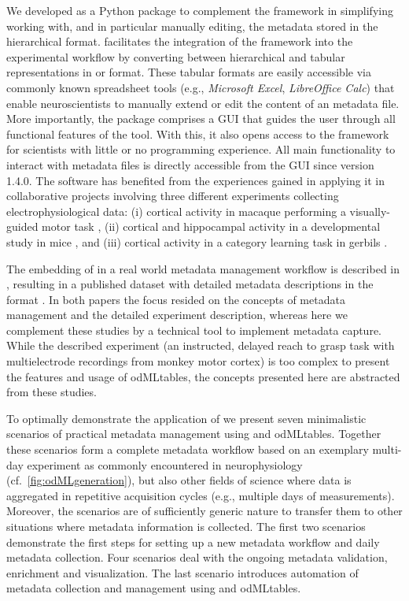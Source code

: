 We developed  as a Python package to complement the  framework in simplifying working with, and in particular manually editing, the metadata stored in the hierarchical  format.  facilitates the integration of the  framework into the experimental workflow by converting between hierarchical  and tabular representations in  or  format. These tabular formats are easily accessible via commonly known spreadsheet tools (e.g., \textit{Microsoft Excel}, \textit{LibreOffice Calc}) that enable neuroscientists to manually extend or edit the content of an  metadata file. More importantly, the  package comprises a GUI that guides the user through all functional features of the tool. With this, it also opens access to the  framework for scientists with little or no programming experience. All main functionality to interact with metadata files is directly accessible from the  GUI since version 1.4.0. The software has benefited from the experiences gained in applying it in collaborative projects involving three different experiments collecting electrophysiological data: (i) cortical activity in macaque performing a visually-guided motor task \citep[e.g.,][]{Denker_2018,Brochier_2018}, (ii) cortical and hippocampal activity in a developmental study in mice \citep[e.g.,][]{Bitzenhofer_2017}, and (iii) cortical activity in a category learning task in gerbils \citep[e.g.,][]{Ohl_2001}.

The embedding of  in a real world metadata management workflow is described in \cite{Zehl_2016}, resulting in a published dataset with detailed metadata descriptions in the  format  \citep{Brochier_2018}. In both papers the focus resided on the concepts of metadata management and the detailed experiment description, whereas here we complement these studies by a technical tool to implement metadata capture. While the described experiment (an instructed, delayed reach to grasp task with multielectrode recordings from monkey motor cortex) is too complex to present the features and usage of odMLtables, the concepts presented here are abstracted from these studies.

To optimally demonstrate the application of  we present seven minimalistic scenarios of practical metadata management using  and odMLtables. Together these scenarios form a complete metadata workflow based on an exemplary multi-day experiment as commonly encountered in neurophysiology (cf.~\cref{fig:odMLgeneration}), but also other fields of science where data is aggregated in repetitive acquisition cycles (e.g., multiple days of measurements). Moreover, the scenarios are of sufficiently generic nature to transfer them to other situations where metadata information is collected. The first two scenarios demonstrate the first steps for setting up a new metadata workflow and daily metadata collection. Four scenarios deal with the ongoing metadata validation, enrichment and visualization. The last scenario introduces automation of metadata collection and management using  and odMLtables.

